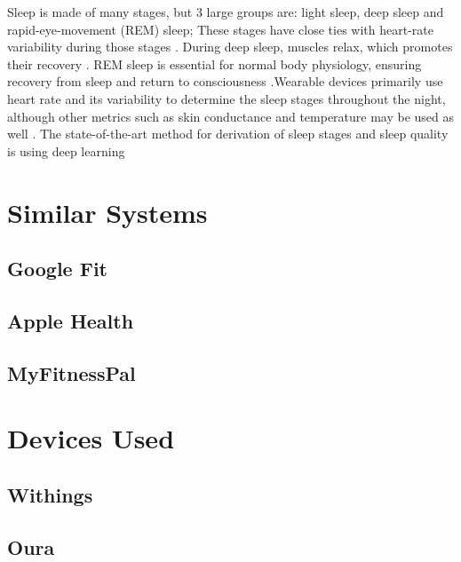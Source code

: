Sleep is made of many stages, but 3 large groups are: light sleep, deep sleep and rapid-eye-movement (REM) sleep; These stages have close ties with heart-rate variability during those stages \cite{sleepDef}. During deep sleep, muscles relax, which promotes their recovery \cite{Jung2010Energy}. REM sleep is essential for normal body physiology, ensuring recovery from sleep and return to consciousness \cite{VERTES1986371}.Wearable devices primarily use heart rate and its variability to determine the sleep stages throughout the night, although other metrics such as skin conductance and temperature may be used as well \cite{Zambotti2019Wearable}. The state-of-the-art method for derivation of sleep stages and sleep quality is using deep learning \cite{Sathyanarayana2016Sleep}

\section{Similar Systems}
\label{section:similarSystems}
\subsection{Google Fit}
\subsection{Apple Health}
\subsection{MyFitnessPal}
\section{Devices Used}
\subsection{Withings}
\label{section:WithingsWatch}
\subsection{Oura}
\label{section:OuraRing}
